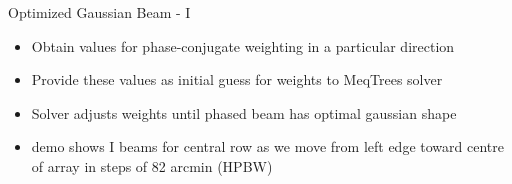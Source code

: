 \documentclass[pdf,azure,slideColor,colorBG]{prosper}
\begin{document}
\begin{slide}{Optimized Gaussian Beam - I}
\begin{small}
\begin{itemize}
\item Obtain values for phase-conjugate weighting in a particular direction
\item Provide these values as initial guess for weights to MeqTrees solver
\item Solver adjusts weights until phased beam has optimal gaussian shape
\item demo shows I beams for central row as we move from left edge toward centre of array in steps of 82 arcmin (HPBW)
\end{itemize}
\end {small}
{\centering
{}
}
\end{slide}
\end{document}
